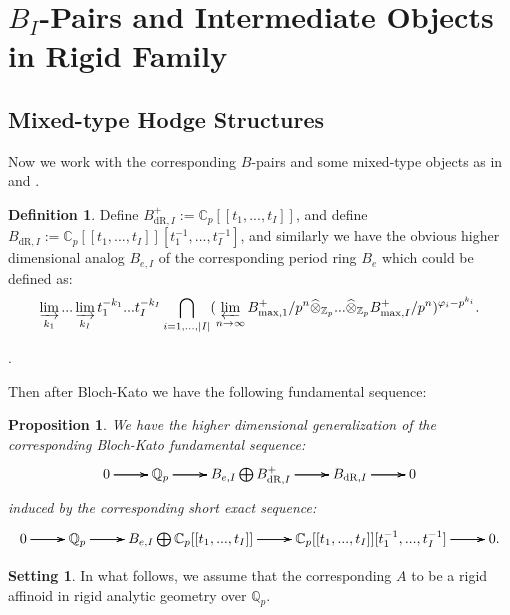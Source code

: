 \documentclass[12pt]{amsart}
\newtheorem{proposition}[theorem]{Proposition}
\theoremstyle{definition}
\newtheorem{definition}[theorem]{Definition}
\numberwithin{equation}{section}
\newtheorem{setting}[theorem]{Setting}
\begin{document}
\newpage

\section{$B_{I}$-Pairs and Intermediate Objects in Rigid Family}


\subsection{Mixed-type Hodge Structures}

\noindent Now we work with the corresponding $B$-pairs and some mixed-type objects as in \cite{Ber1} and \cite{Nak1}.


\begin{definition}
Define $B^+_{\mathrm{dR},I}:=\mathbb{C}_p[[t_1,...,t_I]]$, and define  $B_{\mathrm{dR},I}:=\mathbb{C}_p[[t_1,...,t_I]][t_1^{-1},...,t_I^{-1}]$, and similarly we have the obvious higher dimensional analog $B_{e,I}$ of the corresponding period ring $B_{e}$ which could be defined as:
\begin{align}
\varinjlim_{k_1}...	\varinjlim_{k_I}t_1^{-k_1}...t_I^{-k_I}\bigcap_{i=1,...,|I|}(\varprojlim_{n\rightarrow \infty}B_\mathrm{max,1}^+/p^n\widehat{\otimes}_{\mathbb{Z}_p}...\widehat{\otimes}_{\mathbb{Z}_p}B_{\mathrm{max},I}^+/p^n)^{\varphi_i-p^{k_i}}.
\end{align}






.	
\end{definition}

\indent Then after Bloch-Kato \cite{BK1} we have the following fundamental sequence:

\begin{proposition}
We have the higher dimensional generalization of the corresponding Bloch-Kato fundamental sequence:
\[
\xymatrix@C+0pc@R+0pc{
0 \ar[r] \ar[r] \ar[r] &\mathbb{Q}_p \ar[r] \ar[r] \ar[r]  &B_{e,I}\bigoplus B^+_{\mathrm{dR},I} \ar[r] \ar[r] \ar[r] &B_{\mathrm{dR},I} \ar[r] \ar[r] \ar[r] &0
}
\]
induced by the corresponding short exact sequence:
\[
\xymatrix@C+0pc@R+0pc{
0 \ar[r] \ar[r] \ar[r] &\mathbb{Q}_p \ar[r] \ar[r] \ar[r]  &B_{e,I}\bigoplus \mathbb{C}_p[[t_1,...,t_I]] \ar[r] \ar[r] \ar[r] &\mathbb{C}_p[[t_1,...,t_I]][t_1^{-1},...,t_I^{-1}] \ar[r] \ar[r] \ar[r] &0.
}
\]	
\end{proposition}






\begin{setting}
In what follows, we assume that the corresponding $A$ to be a rigid affinoid in rigid analytic geometry over $\mathbb{Q}_p$.	
\end{setting}
\end{document}

